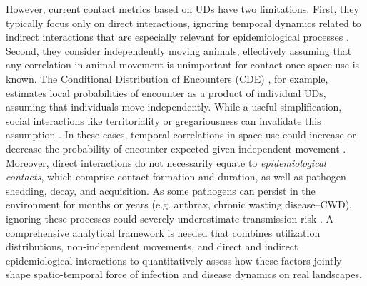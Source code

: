 \documentclass[letterpaper]{article}
\begin{document}
However, current contact metrics based on UDs have two limitations. First, they typically focus only on direct interactions, ignoring temporal dynamics related to indirect interactions that are especially relevant for epidemiological processes \citep{Yang2023}. Second, they consider independently moving animals, effectively assuming that any correlation in animal movement is unimportant for contact once space use is known. The Conditional Distribution of Encounters (CDE) \citep{Noonan2021}, for example, estimates local probabilities of encounter as a product of individual UDs, assuming that individuals move independently.
While a useful simplification, social interactions like territoriality or gregariousness can invalidate this assumption \citep{Manlove2018,Sah2018}. In these cases, temporal correlations in space use could increase or decrease the probability of encounter expected given independent movement \citep{Kjaer2008,Schauber2015a}. 
Moreover, direct interactions do not necessarily equate to \emph{epidemiological contacts}, which comprise contact formation and duration, as well as pathogen shedding, decay, and acquisition. As some pathogens can persist in the environment for months or years (e.g. anthrax, chronic wasting disease--CWD), ignoring these processes could severely underestimate transmission risk \citep{Wilber2022,Yang2023,Richardson2015}.  A comprehensive analytical framework is needed that combines utilization distributions, non-independent movements, and direct and indirect epidemiological interactions to quantitatively assess how these factors jointly shape spatio-temporal force of infection and disease dynamics on real landscapes.

\end{document}
